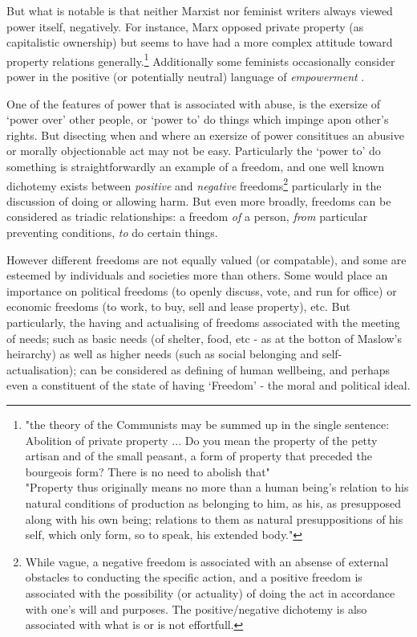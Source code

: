 But what is notable is that neither Marxist nor feminist writers always viewed power itself, negatively.
For instance, Marx opposed private property (as capitalistic ownership) but seems to have had a more complex attitude toward property relations generally.\footnote{"the theory of the Communists may be summed up in the single sentence: Abolition of private property ... Do you mean the property of the petty artisan and of the small peasant, a form of property that preceded the bourgeois form? There is no need to abolish that"\cite{MarxGutenberg}\\"Property thus originally means no more than a human being's relation to his natural conditions of production as belonging to him, as his, as presupposed along with his own being; relations to them as natural presuppositions of his self, which only form, so to speak, his extended body."\cite{marx_capital_I}}
Additionally some feminists occasionally consider power in the positive (or potentially neutral) language of \textit{empowerment} \cite{doi:10.1111/j.1527-2001.1998.tb01350.x}.

One of the features of power that is associated with abuse, is the exersize of `power over' other people, or `power to' do things which impinge apon other's rights.\cite{doi:10.1111/j.1527-2001.1998.tb01350.x}
But disecting when and where an exersize of power consititues an abusive or morally objectionable act may not be easy.
Particularly the `power to' do something is straightforwardly an example of a freedom, and one well known dichotemy exists between \textit{positive} and \textit{negative} freedoms\footnote{While vague, a negative freedom is associated with an absense of external obstacles to conducting the specific action, and a positive freedom is associated with the possibility (or actuality) of doing the act in accordance with one's will and purposes. The positive/negative dichotemy is also associated with what is or is not effortfull.\cite{Mossel2009-MOSNA}} particularly in the discussion of doing or allowing harm.
But even more broadly, freedoms can be considered as triadic relationships: a freedom \textit{of} a person, \textit{from} particular preventing conditions, \textit{to} do certain things.\cite{Negative_and_Positive_Freedom}

However different freedoms are not equally valued (or compatable), and some are esteemed by individuals and societies more than others.
Some would place an importance on political freedoms (to openly discuss, vote, and run for office) or economic freedoms (to work, to buy, sell and lease property), etc. %
But particularly, the having and actualising of freedoms associated with the meeting of needs; such as basic needs (of shelter, food, etc - as at the botton of Maslow's heirarchy) as well as higher needs (such as social belonging and self-actualisation); can be considered as defining of human wellbeing, and perhaps even a constituent of the state of having `Freedom' - the moral and political ideal.


